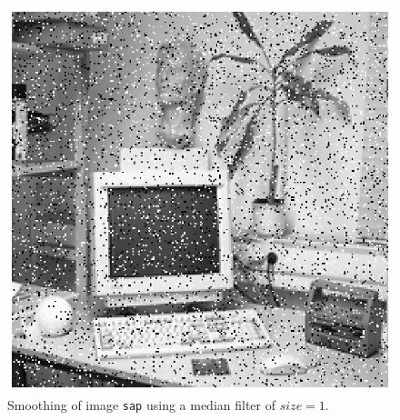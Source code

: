 \begin{minipage}{\linewidth}
\begin{minipage}{0.4\linewidth}
\begin{figure}[H]
      \includegraphics[scale=0.6]{./images/Q17/medfilt/sap_1.eps}
      \caption{Smoothing of image \texttt{sap} using a median filter of $size=1$.}
      \label{fig:Q17_medfilt_sap_1}
    \end{figure}
  \end{minipage}
\end{minipage}
\\


